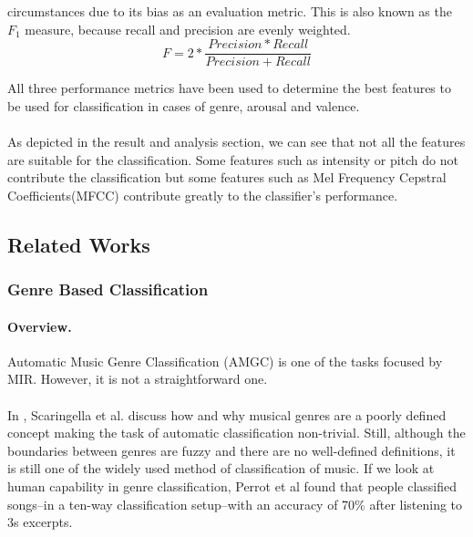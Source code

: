 {\begin{itemize}
                circumstances due to its bias as an evaluation metric. This is also known as the $F_1$ measure, because recall and precision are evenly weighted.
                \begin{equation}
                        F = 2*\frac{Precision*Recall}{Precision+Recall}
                \end{equation}
        \end{itemize}
        All three performance metrics have been used to determine the best features to be used for classification in cases of genre, arousal and valence.\\ 
        \\
    As depicted in the result and analysis section, we can see that not all the features are suitable for the classification. Some features such as intensity or pitch do not contribute 
    the classification but some features such as Mel Frequency Cepstral Coefficients(MFCC) contribute greatly to the classifier’s performance. 



\subsection{Related Works}
    \subsubsection{Genre Based Classification}

\paragraph{Overview.}
Automatic Music Genre Classification (AMGC) is one of the tasks focused by MIR. However, it is not a straightforward one.\\
\\
In \cite{Scaringella2006}, Scaringella et al. discuss how and why musical genres are a poorly defined concept making the task of automatic classification non-trivial.
Still, although the boundaries between genres are fuzzy and there are no well-defined definitions, it is still one of the widely used method of classification of music. 
If we look at human capability in genre classification, Perrot et al \cite{Perrot1999} found that people classified songs--in a ten-way classification setup--with an accuracy of 70\% after listening to 3s excerpts.

}

